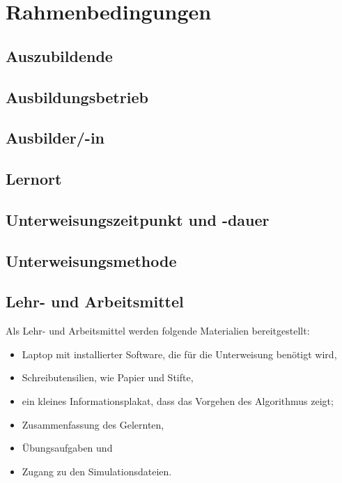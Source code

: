 \chapter{Rahmenbedingungen}

\section{Auszubildende}


\section{Ausbildungsbetrieb}


\section{Ausbilder/-in}


\section{Lernort}


\section{Unterweisungszeitpunkt und -dauer}


\section{Unterweisungsmethode}

\section{Lehr- und Arbeitsmittel}
Als Lehr- und Arbeitsmittel werden folgende Materialien bereitgestellt: 
\begin{itemize}
	\item Laptop mit installierter Software, die für die Unterweisung benötigt wird,
	\item Schreibutensilien, wie Papier und Stifte, 
	\item ein kleines Informationsplakat, dass das Vorgehen des Algorithmus zeigt;
	\item Zusammenfassung des Gelernten,
	\item Übungsaufgaben und 
	\item Zugang zu den Simulationsdateien.
\end{itemize}


